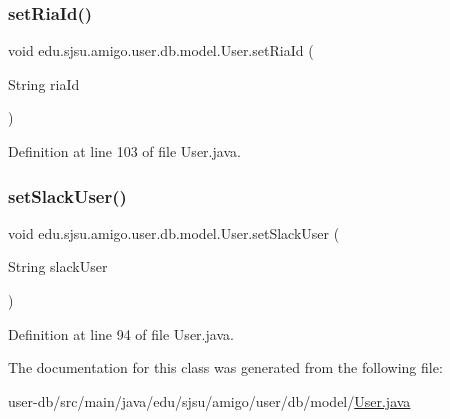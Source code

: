 \subsubsection{\texorpdfstring{set\+Ria\+Id()}{setRiaId()}}
{\footnotesize\ttfamily void edu.\+sjsu.\+amigo.\+user.\+db.\+model.\+User.\+set\+Ria\+Id (\begin{DoxyParamCaption}\item[{String}]{ria\+Id }\end{DoxyParamCaption})}



Definition at line 103 of file User.\+java.

\mbox{\label{classedu_1_1sjsu_1_1amigo_1_1user_1_1db_1_1model_1_1_user_a0f0fc190611371447844c69b663622eb}} 
\subsubsection{\texorpdfstring{set\+Slack\+User()}{setSlackUser()}}
{\footnotesize\ttfamily void edu.\+sjsu.\+amigo.\+user.\+db.\+model.\+User.\+set\+Slack\+User (\begin{DoxyParamCaption}\item[{String}]{slack\+User }\end{DoxyParamCaption})}



Definition at line 94 of file User.\+java.



The documentation for this class was generated from the following file\+:\begin{DoxyCompactItemize}
\item 
user-\/db/src/main/java/edu/sjsu/amigo/user/db/model/\hyperlink{_user_8java}{User.\+java}\end{DoxyCompactItemize}
